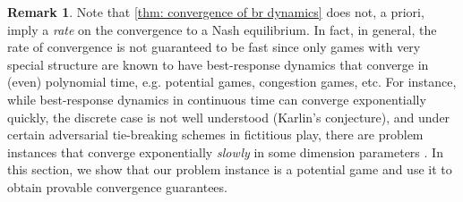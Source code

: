\documentclass{article}
\theoremstyle{plain}
\theoremstyle{definition}
\newtheorem{remark}[theorem]{Remark}
\begin{document}
\begin{remark}
Note that \cref{thm: convergence of br dynamics} does not, a priori, imply a \emph{rate} on the convergence to a Nash equilibrium. In fact, in general, the rate of convergence is not guaranteed to be fast since only games with very special structure are known to have best-response dynamics that converge in (even) polynomial time, e.g. potential games, congestion games, etc. For instance, while best-response dynamics in continuous time can converge exponentially quickly, the discrete case is not well understood (Karlin's conjecture), and under certain adversarial tie-breaking schemes in fictitious play, there are problem instances that converge exponentially \emph{slowly} in some dimension parameters \cite{lazarsfeld2025fastfurioussymmetriclearning,Daskalakis_2014,craven2005karlin,doi:10.1137/1.9781611976465.84}.  In this section, we show that our problem instance is a potential game \cite{guo2025markovalphapotentialgames,yan2025markovpotentialgameconstruction,ding2022independent,arefizadeh2024characterizationspotentialordinalpotential,leonardos2025globalconvergencemultiagentpolicy,overman2025oversightgamelearningcooperatively} and use it to obtain provable convergence guarantees.\\
\end{remark}
\end{document}
